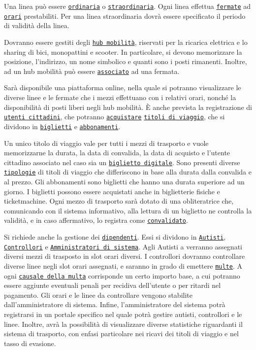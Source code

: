 \documentclass[12pt,a4paper]{report}
\begin{document}
Una linea può essere \underline{\texttt{ordinaria}} o \underline{\texttt{straordinaria}}. Ogni linea effettua \underline{\texttt{fermate}} ad \underline{\texttt{orari}} prestabiliti. Per una linea straordinaria dovrà essere specificato il periodo di validità della linea.

Dovranno essere gestiti degli \underline{\texttt{hub mobilità}}, riservati per la ricarica elettrica e lo sharing di bici, monopattini e scooter. In particolare, si devono memorizzare la posizione, l’indirizzo, un nome simbolico e quanti sono i posti rimanenti. Inoltre, ad un hub mobilità può essere \underline{\texttt{associato}} ad una fermata.

Sarà disponibile una piattaforma online, nella quale si potranno visualizzare le diverse linee e le fermate che i mezzi effettuano con i relativi orari, nonché la disponibilità di posti liberi negli hub mobilità. È anche prevista la registrazione di \underline{\texttt{utenti cittadini}}, che potranno \underline{\texttt{acquistare}} \underline{\texttt{titoli di viaggio}}, che si dividono in \underline{\texttt{biglietti}} e \underline{\texttt{abbonamenti}}.

Un unico titolo di viaggio vale per tutti i mezzi di trasporto e vuole memorizzarne la durata, la data di convalida, la data di acquisto e l’utente cittadino associato nel caso sia un \underline{\texttt{biglietto digitale}}. Sono presenti diverse \underline{\texttt{tipologie}} di titoli di viaggio che differiscono in base alla durata dalla convalida e al prezzo. Gli abbonamenti sono biglietti che hanno una durata superiore ad un giorno. I biglietti possono essere acquistati anche in biglietterie fisiche e ticketmachine. Ogni mezzo di trasporto sarà dotato di una obliteratrice che, comunicando con il sistema informativo, alla lettura di un biglietto ne controlla la validità, e in caso affermativo, lo registra come \underline{\texttt{convalidato}}.

Si richiede anche la gestione dei \underline{\texttt{dipendenti}}. Essi si dividono in \underline{\texttt{Autisti}}, \underline{\texttt{Controllori}} e \underline{\texttt{Amministratori di sistema}}. Agli Autisti a verranno assegnati diversi mezzi di trasposto in slot orari diversi. I controllori dovranno controllare diverse linee negli slot orari assegnati, e saranno in grado di emettere \underline{\texttt{multe}}.  A ogni \underline{\texttt{causale della multa}} corrisponde un certo importo base, a cui potranno essere aggiunte eventuali penali per recidiva dell’utente o per ritardi nel pagamento. Gli orari e le linee da controllare vengono stabilite dall’amministratore di sistema. Infine, l’amministratore del sistema potrà registrarsi in un portale specifico nel quale potrà gestire autisti, controllori e le linee. Inoltre, avrà la possibilità di visualizzare diverse statistiche riguardanti il sistema di trasporto, con enfasi particolare nei ricavi dei titoli di viaggio e nel tasso di evasione.
\end{document}
